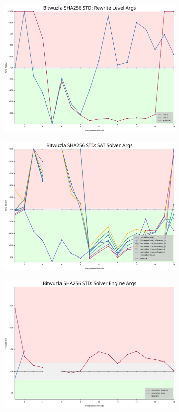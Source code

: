 \begin{figure}[H]
	\centering
	\includegraphics[width=0.8\textwidth]{../../graphs/bitwuzla_rewrite_level_args.svg}
\end{figure}

\begin{figure}[H]
	\centering
	\includegraphics[width=0.8\textwidth]{../../graphs/bitwuzla_sat_solver_args.svg}
\end{figure}

\begin{figure}[H]
	\centering
	\includegraphics[width=0.8\textwidth]{../../graphs/bitwuzla_solver_engine_args.svg}
\end{figure}

